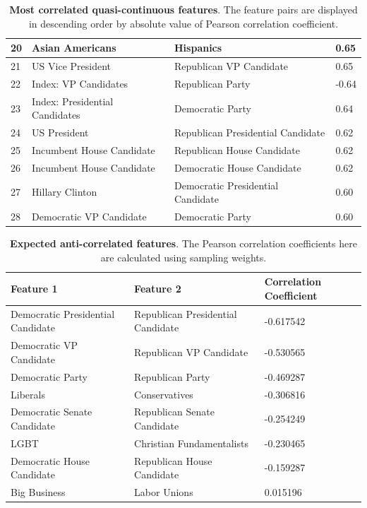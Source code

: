 \documentclass{article}
\begin{document}
\begin{table}[h!]
\begin{center}
\begin{tabular}{ |m{1cm}|m{6cm}|m{6cm}|m{2cm}| }
				\hline
				20 & Asian Americans & Hispanics & 0.65 \\
				\hline
				21 & US Vice President & Republican VP Candidate & 0.65 \\
				\hline
				22 & Index: VP Candidates & Republican Party & -0.64 \\
				\hline
				23 & Index: Presidential Candidates & Democratic Party & 0.64 \\
				\hline
				24 & US President & Republican Presidential Candidate & 0.62 \\
				\hline
				25 & Incumbent House Candidate & Republican House Candidate & 0.62 \\
				\hline
				26 & Incumbent House Candidate & Democratic House Candidate & 0.62 \\
				\hline
				27 & Hillary Clinton & Democratic Presidential Candidate & 0.60 \\
				\hline
				28 & Democratic VP Candidate & Democratic Party & 0.60 \\
				\hline
			\end{tabular}
			\caption{\textbf{Most correlated quasi-continuous features}. The feature pairs are displayed in descending order by absolute value of Pearson correlation coefficient.}
			\label{table:thermometer_most_correlated}
		\end{center}
	\end{table}

	\begin{table}[h!]
		\begin{center}
			\begin{tabular}{ |m{6cm}|m{6cm}|m{2cm}| } 
				\hline
				Feature 1 & Feature 2 & Correlation Coefficient \\
				\hline
				Democratic Presidential Candidate & Republican Presidential Candidate & -0.617542 \\
				\hline
				Democratic VP Candidate & Republican VP Candidate & -0.530565 \\
				\hline
				Democratic Party & Republican Party & -0.469287 \\
				\hline
				Liberals & Conservatives & -0.306816 \\
				\hline
				Democratic Senate Candidate & Republican Senate Candidate & -0.254249 \\
				\hline
				LGBT & Christian Fundamentalists & -0.230465 \\
				\hline
				Democratic House Candidate & Republican House Candidate & -0.159287 \\
				\hline
				Big Business & Labor Unions & 0.015196 \\
				\hline
			\end{tabular}
			\caption{\textbf{Expected anti-correlated features}. The Pearson correlation coefficients here are calculated using sampling weights.}
			\label{table:thermometer_anti_correlated}
		\end{center}
	\end{table}
	
\end{document}
